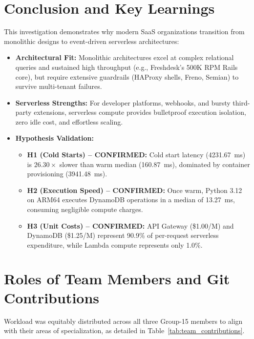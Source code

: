 \documentclass[10pt,a4paper]{article}
\begin{document}
\section{Conclusion and Key Learnings}
This investigation demonstrates why modern SaaS organizations transition from monolithic designs to event-driven serverless architectures:
\begin{itemize}
    \item \textbf{Architectural Fit:} Monolithic architectures excel at complex relational queries and sustained high throughput (e.g., Freshdesk's 500K RPM Rails core), but require extensive guardrails (HAProxy shells, Freno, Semian) to survive multi-tenant failures.
    \item \textbf{Serverless Strengths:} For developer platforms, webhooks, and bursty third-party extensions, serverless compute provides bulletproof execution isolation, zero idle cost, and effortless scaling.
    \item \textbf{Hypothesis Validation:}
    \begin{itemize}
        \item \textbf{H1 (Cold Starts) -- CONFIRMED:} Cold start latency (4231.67~ms) is $26.30\times$ slower than warm median (160.87~ms), dominated by container provisioning (3941.48~ms).
        \item \textbf{H2 (Execution Speed) -- CONFIRMED:} Once warm, Python 3.12 on ARM64 executes DynamoDB operations in a median of 13.27~ms, consuming negligible compute charges.
        \item \textbf{H3 (Unit Costs) -- CONFIRMED:} API Gateway (\$1.00/M) and DynamoDB (\$1.25/M) represent 90.9\% of per-request serverless expenditure, while Lambda compute represents only 1.0\%.
    \end{itemize}
\end{itemize}

\section{Roles of Team Members and Git Contributions}
Workload was equitably distributed across all three Group-15 members to align with their areas of specialization, as detailed in Table~\ref{tab:team_contributions}.
\end{document}
